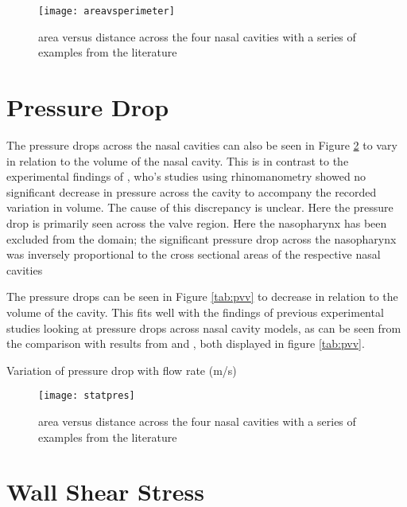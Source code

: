 \begin{figure} 
  \texttt{[image: areavsperimeter]}
  \caption{area versus distance across the four nasal cavities with a series of examples from the literature}
  \label{fig:arpar}
\end{figure}
\section{Pressure Drop}

The pressure drops across the nasal cavities can also be seen in Figure \ref{fig:stpr} to vary in relation to the volume of the nasal cavity. This is in contrast to the experimental findings of \cite{Lindemann2008, Edelstein1996, WhanKim2007}, who’s studies using rhinomanometry showed no significant decrease in pressure across the cavity to accompany the recorded variation in volume. The cause of this discrepancy is unclear. Here the pressure drop is primarily seen across the valve region. Here the nasopharynx has been excluded from the domain; the significant pressure drop across the nasopharynx was inversely proportional to the cross sectional areas of the respective nasal cavities

The pressure drops can be seen in Figure \ref{tab:pvv} to decrease in relation to the volume of the cavity. This fits well with the findings of previous experimental studies looking at pressure drops across nasal cavity models, as can be seen from the comparison with results from \cite{Garcia2007} and \cite{Kelly2004}, both displayed in figure \ref{tab:pvv}.

  \begin{table} 
    \centering

  \caption{Variation of pressure drop with flow rate (m/s)}
  \label{tab:pvv}
\end{table}

\begin{figure} 
  \texttt{[image: statpres]}
  \caption{area versus distance across the four nasal cavities with a series of examples from the literature}
  \label{fig:stpr}
\end{figure}

\section{Wall Shear Stress}

